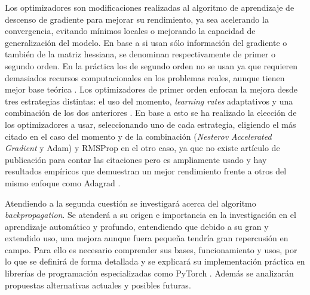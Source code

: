 Los optimizadores son modificaciones realizadas al algoritmo de aprendizaje de descenso de gradiente para mejorar su rendimiento, ya sea acelerando la convergencia, evitando mínimos locales o mejorando la capacidad de generalización del modelo. En base a si usan sólo información del gradiente o también de la matriz hessiana, se denominan respectivamente de primer o segundo orden. En la práctica los de segundo orden no se usan ya que requieren demasiados recursos computacionales en los problemas reales, aunque tienen mejor base teórica \cite{pml1Book}. Los optimizadores de primer orden enfocan la mejora desde tres estrategias distintas: el uso del momento, \textit{learning rates} adaptativos y una combinación de los dos anteriores \cite{overview_GD}. En base a esto se ha realizado la elección de los optimizadores a usar, seleccionando uno de cada estrategia, eligiendo el más citado en el caso del momento y de la combinación (\textit{Nesterov Accelerated Gradient} y Adam) y RMSProp en el otro caso, ya que no existe artículo de publicación para contar las citaciones pero es ampliamente usado y hay resultados empíricos que demuestran un mejor rendimiento frente a otros del mismo enfoque como Adagrad \cite{AdaGrad, overview_GD}. 


Atendiendo a la segunda cuestión se investigará acerca del algoritmo \textit{backpropagation}. Se atenderá a su origen e importancia en la investigación en el aprendizaje automático y profundo, entendiendo que debido a su gran y extendido uso, una mejora aunque fuera pequeña tendría gran repercusión en campo. Para ello es necesario comprender sus bases, funcionamiento y usos, por lo que se definirá de forma detallada y se explicará su implementación práctica en librerías de programación especializadas como PyTorch \cite{PyTorch}. Además se analizarán propuestas alternativas actuales y posibles futuras. 




